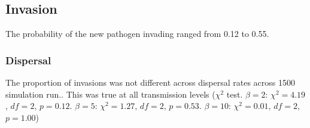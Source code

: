 \subsection{Invasion}
The probability of the new pathogen invading ranged from 0.12 to 0.55.


\subsubsection{Dispersal}


The proportion of invasions was not different across dispersal rates across 1500 simulation run.. 
This was true at all transmission levels ($\chi^2$ test. $\beta = 2$: $\chi^2 = 4.19$, $df = 2$, $p = 0.12$. $\beta = 5$: $\chi^2 = 1.27$, $df = 2$, $p = 0.53$. $\beta = 10$: $\chi^2 = 0.01$, $df = 2$, $p = 1.00$)



